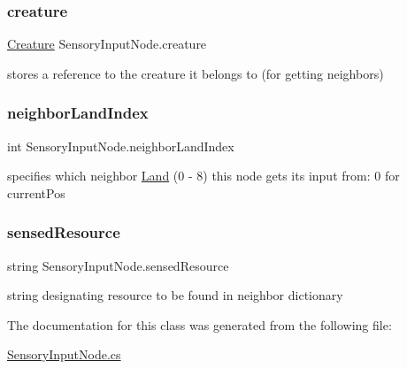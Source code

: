 \subsubsection{\texorpdfstring{creature}{creature}}
{\footnotesize\ttfamily \mbox{\hyperlink{class_creature}{Creature}} Sensory\+Input\+Node.\+creature}



stores a reference to the creature it belongs to (for getting neighbors) 

\mbox{\label{class_sensory_input_node_aed52405e2e63c5e5ca6ad0142b3aaede}} 
\subsubsection{\texorpdfstring{neighbor\+Land\+Index}{neighborLandIndex}}
{\footnotesize\ttfamily int Sensory\+Input\+Node.\+neighbor\+Land\+Index}



specifies which neighbor \mbox{\hyperlink{class_land}{Land}} (0 -\/ 8) this node gets it\textquotesingle{}s input from\+: 0 for current\+Pos 

\mbox{\label{class_sensory_input_node_a928c67bebc7f59466c91cbc6c5552bb4}} 
\subsubsection{\texorpdfstring{sensed\+Resource}{sensedResource}}
{\footnotesize\ttfamily string Sensory\+Input\+Node.\+sensed\+Resource}



string designating resource to be found in neighbor dictionary 



The documentation for this class was generated from the following file\+:\begin{DoxyCompactItemize}
\item 
\mbox{\hyperlink{_sensory_input_node_8cs}{Sensory\+Input\+Node.\+cs}}\end{DoxyCompactItemize}
